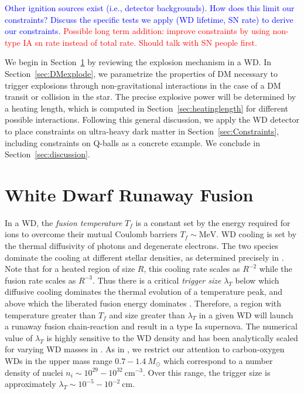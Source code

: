 \documentclass[twocolumn,showpacs,preprintnumbers,amsmath,amssymb,prd]{revtex4}
\newcommand{\MeV}{\text{MeV}}
\newcommand{\cm}{\text{cm}}
\begin{document}
\textcolor{blue}{Other ignition sources exist (i.e., detector backgrounds). How does this limit our constraints? Discuss the specific tests we apply (WD lifetime, SN rate) to derive our constraints.} \textcolor{red}{Possible long term addition: improve constraints by using non-type IA sn rate instead of total rate. Should talk with SN people first.}

We begin in Section~\ref{sec:review} by reviewing the explosion mechanism in a WD. In Section~\ref{sec:DMexplode}, we parametrize the properties of DM necessary to trigger explosions through non-gravitational interactions in the case of a DM transit or collision in the star. The precise explosive power will be determined by a heating length, which is computed in Section~\ref{sec:heatinglength} for different possible interactions. Following this general discussion, we apply the WD detector to place constraints on ultra-heavy dark matter in Section~\ref{sec:Constraints}, including constraints on Q-balls as a concrete example. We conclude in Section~\ref{sec:discussion}.

\section{White Dwarf Runaway Fusion}
\label{sec:review}
In a WD, the \emph{fusion temperature} $T_f$ is a constant set by the energy required for ions to overcome their mutual Coulomb barriers $T_f \sim \MeV$. WD cooling is set by the thermal diffusivity of photons and degenerate electrons. The two species dominate the cooling at different stellar densities, as determined precisely in \cite{Woosley}. Note that for a heated region of size $R$, this cooling rate scales as $R^{-2}$ while the fusion rate scales as $R^{-3}$. Thus there is a critical \emph{trigger size} $\lambda_T$ below which diffusive cooling dominates the thermal evolution of a temperature peak, and above which the liberated fusion energy dominates \cite{Woosley}. Therefore, a region with temperature greater than $T_f$ and size greater than $\lambda_T$ in a given WD will launch a runaway fusion chain-reaction and result in a type Ia supernova. The numerical value of $\lambda_T$ is highly sensitive to the WD density and has been analytically scaled for varying WD masses in \cite{Graham:2015apa}. As in \cite{Graham:2015apa}, we restrict our attention to carbon-oxygen WDs in the upper mass range $0.7 - 1.4 ~M_{\odot}$ which correspond to a number density of nuclei $n_i \sim 10^{29} - 10^{32} ~\cm^{-3}$. Over this range, the trigger size is approximately $\lambda_T \sim 10^{-5} - 10^{-2} ~\text{cm}$.
\end{document}
